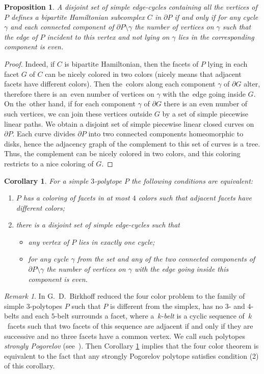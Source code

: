 \documentclass[12pt]{amsart}
\newtheorem{proposition}[formula]{Proposition}
\newtheorem{corollary}[formula]{Corollary}
\theoremstyle{definition}
\theoremstyle{remark}
\newtheorem{remark}[formula]{Remark}
\begin{document}
\begin{proposition}
A disjoint set of simple edge-cycles containing all the vertices of $P$ defines
a bipartite Hamiltonian subcomplex $C$ in $\partial P$ if and only if for any cycle $\gamma$ and each connected 
component of $\partial P\setminus\gamma$ the number of vertices on $\gamma$ such that the
edge of $P$ incident to this vertex and not lying on $\gamma$ lies in the corresponding component is even. 
\end{proposition}
\begin{proof}
Indeed, if $C$ is bipartite Hamiltonian, then the facets of $P$ lying in each facet $G$ of $C$ can be nicely colored in two
colors (nicely means that adjacent facets have different colors).
Then the~colors along each component $\gamma$ of $\partial G$ alter, therefore there is an~even number 
of vertices on $\gamma$ with the~edge going inside $G$. On the~other hand, if for each component $\gamma$ of $\partial G$
there is an even number of such vertices, we can join these vertices outside $G$ by a set of simple 
piecewise linear paths. We obtain a disjoint set of simple piecewise linear closed curves on $\partial P$. Each curve 
divides $\partial P$ into two connected components homeomorphic to disks, hence the adjacency graph of the complement
to this set of curves is a tree. Thus, the complement can be nicely colored in two colors, and this coloring 
restricts to a nice coloring of $G$.
\end{proof}
\begin{corollary}\label{cor:4cp}
For a simple $3$-polytope $P$ the following conditions are equivalent:
\begin{enumerate}
\item $P$ has a coloring of facets in at most $4$ colors such that 
adjacent facets have different colors;
\item there is a disjoint set of simple edge-cycles such that
\begin{itemize}
\item any vertex of $P$ lies in exactly one cycle;
\item for any cycle $\gamma$ from the set and any of the two connected components of $\partial P\setminus\gamma$
the number of vertices on $\gamma$ with the edge going inside this component is even.
\end{itemize}
\end{enumerate} 
\end{corollary}
\begin{remark}
In \cite{B1913} G.~D.~Birkhoff reduced the four color problem 
to the family of simple $3$-polytopes $P$ such that $P$ is different from the simplex,
has no $3$- and $4$-belts and each $5$-belt surrounds a facet, where a~$k$-{\it belt} is a cyclic sequence of~$k$~facets 
such that two facets of this sequence are adjacent if and only if they are successive and no three facets
have a common vertex. We call such polytopes {\it strongly Pogorelov} (see~\cite{E19}). Then Corollary \ref{cor:4cp}
implies that the four color theorem is equivalent to the fact that any strongly Pogorelov polytope 
satisfies condition (2) of this corollary.
\end{remark}
\end{document}
